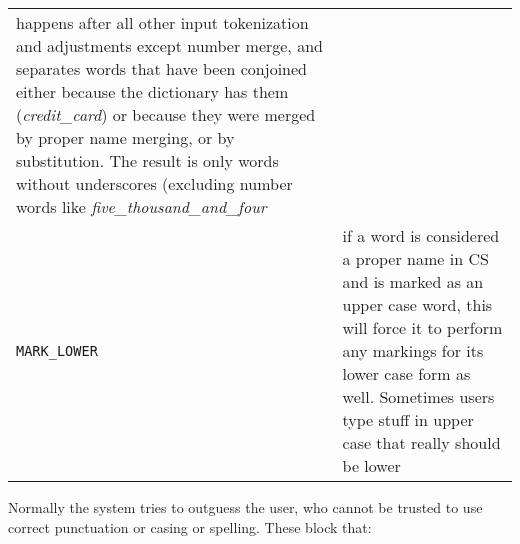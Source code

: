 \documentclass[]{article}
\begin{document}
\begin{longtable}[]{@{}ll@{}}
\begin{minipage}[t]{0.10\columnwidth}
happens after all other input tokenization and adjustments except number
merge, and separates words that have been conjoined either because the
dictionary has them (\emph{credit\_card}) or because they were merged by
proper name merging, or by substitution. The result is only words
without underscores (excluding number words like
\emph{five\_thousand\_and\_four}\strut
\end{minipage}\tabularnewline
\begin{minipage}[t]{0.07\columnwidth}\raggedright\strut
\texttt{MARK\_LOWER}\strut
\end{minipage} & \begin{minipage}[t]{0.10\columnwidth}\raggedright\strut
if a word is considered a proper name in CS and is marked as an upper
case word, this will force it to perform any markings for its lower case
form as well. Sometimes users type stuff in upper case that really
should be lower\strut
\end{minipage}\tabularnewline
\bottomrule
\end{longtable}

Normally the system tries to outguess the user, who cannot be trusted to
use correct punctuation or casing or spelling. These block that:
\end{document}
